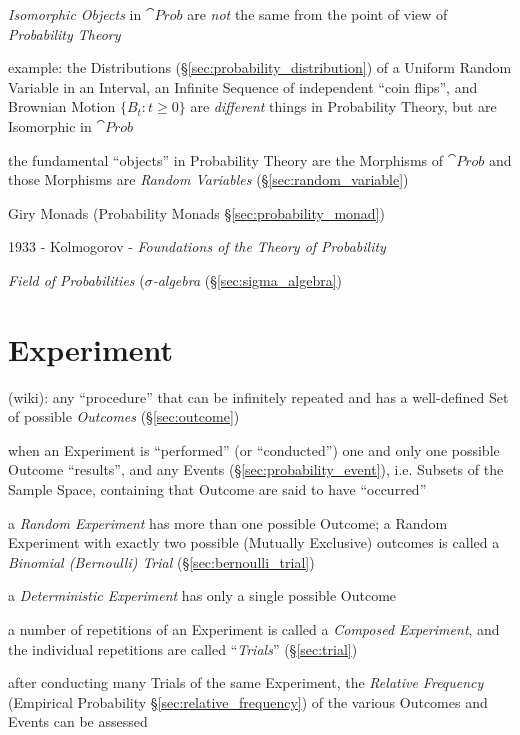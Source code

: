\emph{Isomorphic Objects} in $\cat{Prob}$ are \emph{not} the same from the point
of view of \emph{Probability Theory}

example: the Distributions (\S\ref{sec:probability_distribution}) of a Uniform
Random Variable in an Interval, an Infinite Sequence of independent ``coin
flips'', and Brownian Motion $\{B_t : t \geq 0\}$ are \emph{different} things in
Probability Theory, but are Isomorphic in $\cat{Prob}$

the fundamental ``objects'' in Probability Theory are the Morphisms of
$\cat{Prob}$ and those Morphisms are \emph{Random Variables}
(\S\ref{sec:random_variable})

\fist Giry Monads (Probability Monads \S\ref{sec:probability_monad})

\asterism

1933 - Kolmogorov - \emph{Foundations of the Theory of Probability}

\emph{Field of Probabilities} (\emph{$\sigma$-algebra}
(\S\ref{sec:sigma_algebra})



\section{Experiment}\label{sec:experiment}

(wiki): any ``procedure'' that can be infinitely repeated and has a well-defined
Set of possible \emph{Outcomes} (\S\ref{sec:outcome})

when an Experiment is ``performed'' (or ``conducted'') one and only one possible
Outcome ``results'', and any Events (\S\ref{sec:probability_event}), i.e.
Subsets of the Sample Space, containing that Outcome are said to have
``occurred''

a \emph{Random Experiment} has more than one possible Outcome; a Random
Experiment with exactly two possible (Mutually Exclusive) outcomes is called a
\emph{Binomial (Bernoulli) Trial} (\S\ref{sec:bernoulli_trial})

a \emph{Deterministic Experiment} has only a single possible Outcome

a number of repetitions of an Experiment is called a \emph{Composed Experiment},
and the individual repetitions are called ``\emph{Trials}'' (\S\ref{sec:trial})

after conducting many Trials of the same Experiment, the \emph{Relative
  Frequency} (Empirical Probability \S\ref{sec:relative_frequency}) of the
various Outcomes and Events can be assessed

